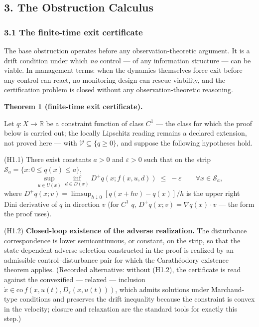 \documentclass[11pt]{article}
\begin{document}
\subsection{3. The Obstruction Calculus}\label{the-obstruction-calculus}

\subsubsection{3.1 The finite-time exit
certificate}\label{the-finite-time-exit-certificate}

The base obstruction operates before any observation-theoretic argument.
It is a drift condition under which \emph{no} control --- of any
information structure --- can be viable. In management terms: when the
dynamics themselves force exit before any control can react, no
monitoring design can rescue viability, and the certification problem is
closed without any observation-theoretic reasoning.

\textbf{Theorem 1 (finite-time exit certificate).}

Let \(q : X \to \mathbb{R}\) be a constraint function of class \(C^1\)
--- the class for which the proof below is carried out; the locally
Lipschitz reading remains a declared extension, not proved here --- with
\(\mathcal{V} \subseteq \{ q \ge 0 \}\), and suppose the following
hypotheses hold.

(H1.1) There exist constants \(a > 0\) and \(\varepsilon > 0\) such that
on the strip \(\mathcal{S}_a = \{ x : 0 \le q(x) \le a \}\),
\[\sup_{u \in U(x)} \inf_{d \in D(x)} D^+ q(x; f(x,u,d)) \;\le\; -\varepsilon \qquad \forall x \in \mathcal{S}_a, \tag{1}\]
where \(D^+ q(x; v) = \limsup_{h \downarrow 0} [q(x + hv) - q(x)]/h\) is
the upper right Dini derivative of \(q\) in direction \(v\) (for \(C^1\)
\(q\), \(D^+ q(x; v) = \nabla q(x) \cdot v\) --- the form the proof
uses).

(H1.2) \textbf{Closed-loop existence of the adverse realization.} The
disturbance correspondence is lower semicontinuous, or constant, on the
strip, so that the state-dependent adverse selection constructed in the
proof is realized by an admissible control--disturbance pair for which
the Carath\'eodory existence theorem applies. (Recorded alternative:
without (H1.2), the certificate is read against the convexified ---
relaxed --- inclusion
\(\dot x \in \mathrm{co}\, f(x, u(t), D_{\varepsilon}(x, u(t)))\), which
admits solutions under Marchaud-type conditions and preserves the drift
inequality because the constraint is convex in the velocity; closure and
relaxation are the standard tools for exactly this step.)
\end{document}

